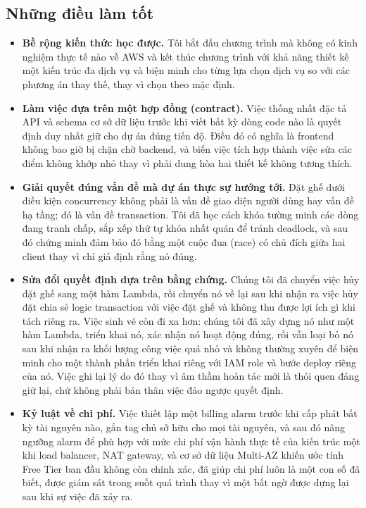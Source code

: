 \documentclass[a4paper,12pt]{article}
\begin{document}
\subsection{Những điều làm tốt}

\begin{itemize}
    \item \textbf{Bề rộng kiến thức học được.} Tôi bắt đầu chương trình mà không có kinh nghiệm thực tế nào về AWS và kết thúc chương trình với khả năng thiết kế một kiến trúc đa dịch vụ và biện minh cho từng lựa chọn dịch vụ so với các phương án thay thế, thay vì chọn theo mặc định.
    \item \textbf{Làm việc dựa trên một hợp đồng (contract).} Việc thống nhất đặc tả API và schema cơ sở dữ liệu trước khi viết bất kỳ dòng code nào là quyết định duy nhất giữ cho dự án đúng tiến độ. Điều đó có nghĩa là frontend không bao giờ bị chặn chờ backend, và biến việc tích hợp thành việc sửa các điểm không khớp nhỏ thay vì phải dung hòa hai thiết kế không tương thích.
    \item \textbf{Giải quyết đúng vấn đề mà dự án thực sự hướng tới.} Đặt ghế dưới điều kiện concurrency không phải là vấn đề giao diện người dùng hay vấn đề hạ tầng; đó là vấn đề transaction. Tôi đã học cách khóa tường minh các dòng đang tranh chấp, sắp xếp thứ tự khóa nhất quán để tránh deadlock, và sau đó chứng minh đảm bảo đó bằng một cuộc đua (race) có chủ đích giữa hai client thay vì chỉ giả định rằng nó đúng.
    \item \textbf{Sửa đổi quyết định dựa trên bằng chứng.} Chúng tôi đã chuyển việc hủy đặt ghế sang một hàm Lambda, rồi chuyển nó về lại sau khi nhận ra việc hủy đặt chia sẻ logic transaction với việc đặt ghế và không thu được lợi ích gì khi tách riêng ra. Việc sinh vé còn đi xa hơn: chúng tôi đã xây dựng nó như một hàm Lambda, triển khai nó, xác nhận nó hoạt động đúng, rồi vẫn loại bỏ nó sau khi nhận ra khối lượng công việc quá nhỏ và không thường xuyên để biện minh cho một thành phần triển khai riêng với IAM role và bước deploy riêng của nó. Việc ghi lại lý do đó thay vì âm thầm hoàn tác mới là thói quen đáng giữ lại, chứ không phải bản thân việc đảo ngược quyết định.
    \item \textbf{Kỷ luật về chi phí.} Việc thiết lập một billing alarm trước khi cấp phát bất kỳ tài nguyên nào, gắn tag chủ sở hữu cho mọi tài nguyên, và sau đó nâng ngưỡng alarm để phù hợp với mức chi phí vận hành thực tế của kiến trúc một khi load balancer, NAT gateway, và cơ sở dữ liệu Multi-AZ khiến ước tính Free Tier ban đầu không còn chính xác, đã giúp chi phí luôn là một con số đã biết, được giám sát trong suốt quá trình thay vì một bất ngờ được dựng lại sau khi sự việc đã xảy ra.
\end{itemize}
\end{document}
